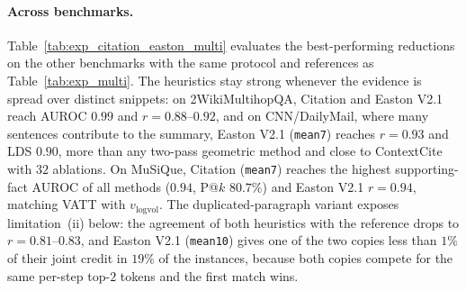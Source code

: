 \paragraph{Across benchmarks.}
Table~\ref{tab:exp_citation_easton_multi} evaluates the best-performing reductions on the other benchmarks with the same protocol and references as Table~\ref{tab:exp_multi}. The heuristics stay strong whenever the evidence is spread over distinct snippets: on 2WikiMultihopQA, Citation and Easton V2.1 reach AUROC $0.99$ and $r = 0.88$--$0.92$, and on CNN/DailyMail, where many sentences contribute to the summary, Easton V2.1 (\texttt{mean7}) reaches $r = 0.93$ and LDS $0.90$, more than any two-pass geometric method and close to ContextCite with $32$ ablations. On MuSiQue, Citation (\texttt{mean7}) reaches the highest supporting-fact AUROC of all methods ($0.94$, P@$k$ $80.7\%$) and Easton V2.1 $r = 0.94$, matching VATT with $v_{\text{logvol}}$. The duplicated-paragraph variant exposes limitation~(ii) below: the agreement of both heuristics with the reference drops to $r = 0.81$--$0.83$, and Easton V2.1 (\texttt{mean10}) gives one of the two copies less than $1\%$ of their joint credit in $19\%$ of the instances, because both copies compete for the same per-step top-$2$ tokens and the first match wins.

